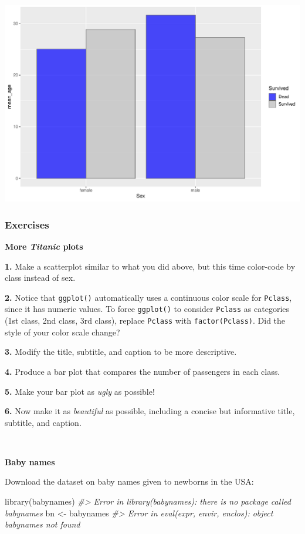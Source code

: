 \documentclass[
]{book}
\newenvironment{Shaded}{\begin{snugshade}}{\end{snugshade}}
\newcommand{\CommentTok}[1]{\textcolor[rgb]{0.56,0.35,0.01}{\textit{#1}}}
\newcommand{\FunctionTok}[1]{\textcolor[rgb]{0.00,0.00,0.00}{#1}}
\newcommand{\NormalTok}[1]{#1}
\newcommand{\OtherTok}[1]{\textcolor[rgb]{0.56,0.35,0.01}{#1}}
\begin{document}
\includegraphics[width=694.08px]{figures/unnamed-chunk-171-1}

\hypertarget{exercises-5}{%
\subsubsection*{Exercises}\label{exercises-5}}

\textbf{More \emph{Titanic} plots}

\textbf{1.} Make a scatterplot similar to what you did above, but this time color-code by class instead of sex.

\textbf{2.} Notice that \texttt{ggplot()} automatically uses a continuous color scale for \texttt{Pclass}, since it has numeric values. To force \texttt{ggplot()} to consider \texttt{Pclass} as categories (1st class, 2nd class, 3rd class), replace \texttt{Pclass} with \texttt{factor(Pclass)}. Did the style of your color scale change?

\textbf{3.} Modify the title, subtitle, and caption to be more descriptive.

\textbf{4.} Produce a bar plot that compares the number of passengers in each class.

\textbf{5.} Make your bar plot as \emph{ugly} as possible!

\textbf{6.} Now make it as \emph{beautiful} as possible, including a concise but informative title, subtitle, and caption.

~

\textbf{Baby names}

Download the dataset on baby names given to newborns in the USA:

\begin{Shaded}
\begin{Highlighting}[]
\FunctionTok{library}\NormalTok{(babynames)}
\CommentTok{\#\textgreater{} Error in library(babynames): there is no package called \textquotesingle{}babynames\textquotesingle{}}
\NormalTok{bn }\OtherTok{\textless{}{-}}\NormalTok{ babynames}
\CommentTok{\#\textgreater{} Error in eval(expr, envir, enclos): object \textquotesingle{}babynames\textquotesingle{} not found}
\end{Highlighting}
\end{Shaded}
\end{document}
